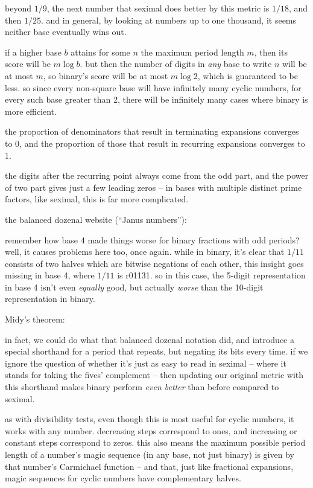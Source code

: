 \documentclass[../footnotes.tex]{subfiles}
\begin{document}
\myfootnote{} beyond $1/9$, the next number that seximal does better by this metric is $1/18$, and then $1/25$. and in general, by looking at numbers up to one thousand, it seems neither base eventually wins out.

\myfootnote{} if a higher base $b$ attains for some $n$ the maximum period length $m$, then its score will be $m \log b$. but then the number of digits in \emph{any} base to write $n$ will be at most $m$, so binary's score will be at most $m \log 2$, which is guaranteed to be less. so since every non-square base will have infinitely many cyclic numbers, for every such base greater than 2, there will be infinitely many cases where binary is more efficient.

\myfootnote{} the proportion of denominators that result in terminating expansions converges to 0, and the proportion of those that result in recurring expansions converges to 1.

\myfootnote{} the digits after the recurring point always come from the odd part, and the power of two part gives just a few leading zeros -- in bases with multiple distinct prime factors, like seximal, this is far more complicated.

\myfootnote{} the balanced dozenal website (``Janus numbers''): \\

\myfootnote{} remember how base 4 made things worse for binary fractions with odd periods? well, it causes problems here too, once again. while in binary, it's clear that $1/11$ consists of two halves which are bitwise negations of each other, this insight goes missing in base 4, where $1/11$ is r01131. so in this case, the 5-digit representation in base 4 isn't even \emph{equally} good, but actually \emph{worse} than the 10-digit representation in binary.

\myfootnote{} Midy's theorem: \\

\myfootnote{} in fact, we could do what that balanced dozenal notation did, and introduce a special shorthand for a period that repeats, but negating its bits every time. if we ignore the question of whether it's just as easy to read in seximal -- where it stands for taking the fives' complement -- then updating our original metric with this shorthand makes binary perform \emph{even better} than before compared to seximal.

\myfootnote{} as with divisibility tests, even though this is most useful for cyclic numbers, it works with any number. decreasing steps correspond to ones, and increasing or constant steps correspond to zeros. this also means the maximum possible period length of a number's magic sequence (in any base, not just binary) is given by that number's Carmichael function -- and that, just like fractional expansions, magic sequences for cyclic numbers have complementary halves.
\end{document}
